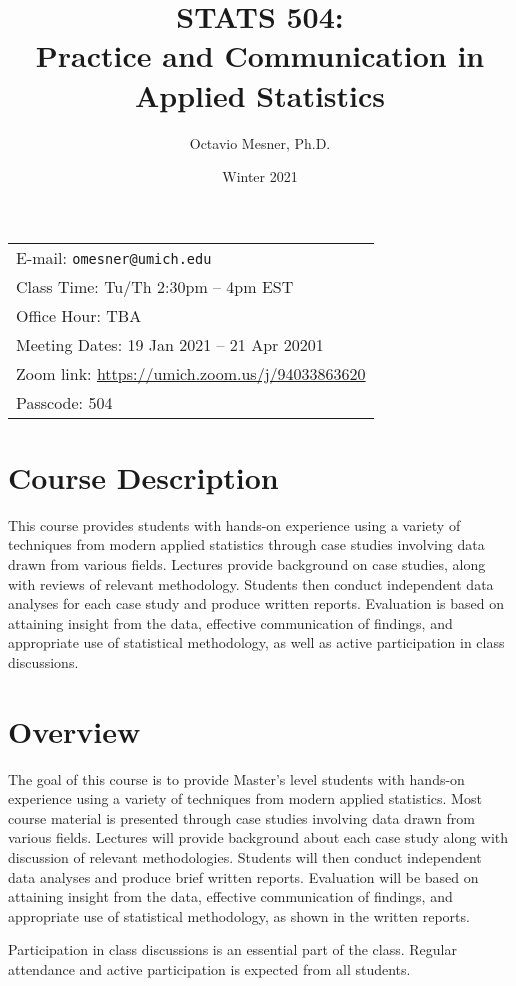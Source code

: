 \documentclass[11pt]{article}
\title{STATS 504: \\ Practice and Communication in Applied Statistics}
\author{Octavio Mesner, Ph.D.}
\date{Winter 2021}
\begin{document}
\maketitle
\begin{tabular}{l}
E-mail: \texttt{omesner@umich.edu} \\
Class Time: Tu/Th 2:30pm -- 4pm EST \\
Office Hour: TBA  \\
Meeting Dates: 19 Jan 2021 -- 21 Apr 20201\\
Zoom link: \url{https://umich.zoom.us/j/94033863620} \\
 Passcode: 504 \\
\end{tabular}

\section*{Course Description}

This course provides students with hands-on experience using a variety of techniques from modern applied statistics through case studies involving data drawn from various fields.
Lectures  provide background on case studies, along with reviews of relevant methodology.
Students then conduct independent data analyses for each case study and produce written reports.
Evaluation is based on attaining insight from the data, effective communication of findings, and appropriate use of statistical methodology, as well as active participation in class discussions.

\section*{Overview}

The goal of this course is to provide Master’s level students with hands-on experience using a variety of techniques from modern applied statistics.
Most course material is presented through case studies involving data drawn from various fields.
Lectures will provide background about each case study along with discussion of relevant methodologies.
Students will then conduct independent data analyses and produce brief written reports.
Evaluation will be based on attaining insight from the data, effective communication of findings, and appropriate use of statistical methodology, as shown in the written reports.

Participation in class discussions is an essential part of the class.
Regular attendance and active participation is expected from all students.
\end{document}
